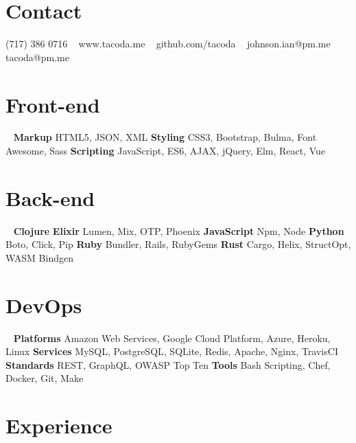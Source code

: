 \documentclass[]{cv-style}          %
\begin{document}


\begin{aside}
%
\section{Contact}
(717) 386 0716
~
www.tacoda.me
~
github.com/tacoda
~
johnson.ian@pm.me
tacoda@pm.me
%
\section{Front-end}
~
\textbf{Markup}
HTML5, JSON, XML
\textbf{Styling}
CSS3, Bootstrap, Bulma, Font Awesome, Sass
\textbf{Scripting}
JavaScript, ES6, AJAX, jQuery, Elm, React, Vue
\section{Back-end}
~
\textbf{Clojure}
\textbf{Elixir}
Lumen, Mix, OTP, Phoenix
\textbf{JavaScript}
Npm, Node
\textbf{Python}
Boto, Click, Pip
\textbf{Ruby}
Bundler, Rails, RubyGems
\textbf{Rust}
Cargo, Helix, StructOpt, WASM Bindgen
\section{DevOps}
~
\textbf{Platforms}
Amazon Web Services, Google Cloud Platform, Azure, Heroku, Linux
\textbf{Services}
MySQL, PostgreSQL, SQLite, Redis, Apache, Nginx, TravisCI
\textbf{Standards}
REST, GraphQL, OWASP Top Ten
\textbf{Tools}
Bash Scripting, Chef, Docker, Git, Make
\end{aside}


\section{Experience}
\end{document}
